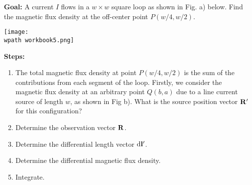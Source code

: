 \documentclass[../../header.tex]{subfiles}
\begin{document}
\textbf{Goal:} A current $I$ flows in a $w\times w$ square loop as shown in Fig. a) below. Find the magnetic flux density at the off-center point $P(w/4, w/2)$.

\begin{center}
\texttt{[image: \\wpath workbook5.png]}
\end{center}
\textbf{Steps:} 
\begin{enumerate}
\item The total magnetic flux density at point $P(w/4,w/2)$ is the sum of the contributions from each segment of the loop. Firstly, we consider the magnetic flux density at an arbitrary point $Q(b,a)$ due to a line current source of length $w$, as shown in Fig b). What is the source position vector $\mathbf{R}'$ for this configuration?\\

\item Determine the observation vector $\mathbf{R}$.\\

\item Determine the differential length vector ${\operatorname d}\mathbf{l}'$.\\

\item Determine the differential magnetic flux density.\\

\item Integrate.\\


\end{enumerate}
\end{document}
